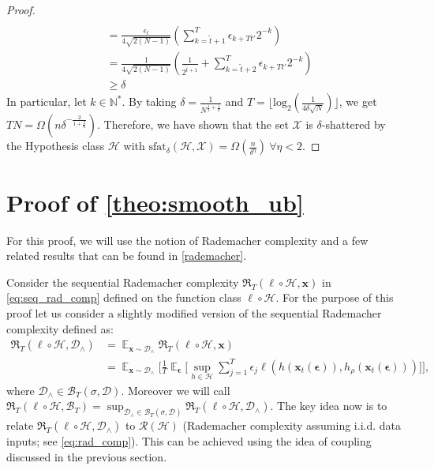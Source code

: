 \begin{proof}
\begin{align}
        \nonumber\\&=\frac{\epsilon_t}{4\sqrt{2(N-1)}}(\sum_{k=\tilde t+1}^{T}\epsilon_{k+Tt'}2^{-k})
        \nonumber\\&=\frac{1}{4\sqrt{2(N-1)}}(\frac{1}{2^{\tilde t+1}}+\sum_{k=\tilde t+2}^{T}\epsilon_{k+Tt'}2^{-k})
        \nonumber\\&\ge\delta
    \end{align}
In particular, let $k\in\mathbb N^*$. By taking $\delta=\frac1{N^{\frac12+\frac1k}}$ and $T=\lfloor\text{log}_2(\frac1{ 4\delta \sqrt{N}})\rfloor$, we get $TN=\Omega( n\delta^{-\frac2{1+\frac2k}})$. Therefore, we have shown that the set $\mathcal{X}$ is $\delta$-shattered by the Hypothesis class $\mathcal{H}$ with $\text{sfat}_\delta(\mathcal H, \mathcal{X})=\Omega(\frac n{\delta^\eta}) \ \forall\eta<2$.
\end{proof}




\section{Proof of \cref{theo:smooth_ub}}\label{pf:smooth}

For this proof, we will use the notion of Rademacher complexity and a few related results that can be found in \cref{rademacher}.

Consider the sequential Rademacher complexity $\mathfrak{R}_T (\ell \circ \mathcal{H}, \mathbf{x})$ in \cref{eq:seq_rad_comp} defined on the function class $\ell \circ \mathcal{H}$.  For the purpose of this proof let us consider a slightly modified version of the sequential Rademacher complexity defined as:
\begin{align}
    \mathfrak{R}_T (\ell \circ \mathcal{H}, \mathcal{D}_\wedge) &= \mathop{\mathbb{E}}_{\mathbf{x} \sim \mathcal{D}_\wedge} \mathfrak{R}_T (\ell \circ \mathcal{H}, \mathbf{x}) \nonumber \\
    &= \mathop{\mathbb{E}}_{\mathbf{x} \sim \mathcal{D}_\wedge} \Big[\frac{1}{T} \mathop{\mathbb{E}}_{\boldsymbol{\epsilon}} \Big[ \sup_{h \in \mathcal{H}} \sum_{j=1}^T \epsilon_j \ell (h(\mathbf{x}_t(\boldsymbol{\epsilon})), h_\rho (\mathbf{x}_t(\boldsymbol{\epsilon}))) \Big]
\Big],
\end{align}
where $\mathcal{D}_\wedge \in \mathcal{B}_T (\sigma, \mathcal{D})$. Moreover we will call $\mathfrak{R}_T (\ell \circ \mathcal{H}, \mathcal{B}_T) = \sup_{\mathcal{D}_\wedge \in \mathcal{B}_T(\sigma, \mathcal{D})} \mathfrak{R}_T (\ell \circ \mathcal{H}, \mathcal{D}_\wedge)$. The key idea now is to relate $\mathfrak{R}_T (\ell \circ \mathcal{H}, \mathcal{D}_\wedge)$ to $\mathcal{R} (\mathcal{H})$ (Rademacher complexity assuming i.i.d. data inputs; see \cref{eq:rad_comp}). This can be achieved using the idea of coupling discussed in the previous section. 


